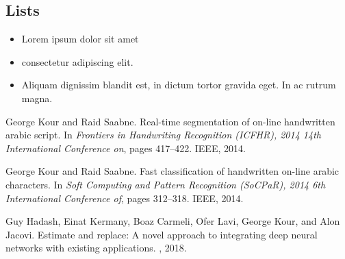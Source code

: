 \documentclass{article}
\begin{document}
\subsection{Lists}
\begin{itemize}
\item Lorem ipsum dolor sit amet
\item consectetur adipiscing elit. 
\item Aliquam dignissim blandit est, in dictum tortor gravida eget. In ac rutrum magna.
\end{itemize}


  


\begin{thebibliography}{1}

George Kour and Raid Saabne.
\newblock Real-time segmentation of on-line handwritten arabic script.
\newblock In {\em Frontiers in Handwriting Recognition (ICFHR), 2014 14th
  International Conference on}, pages 417--422. IEEE, 2014.

George Kour and Raid Saabne.
\newblock Fast classification of handwritten on-line arabic characters.
\newblock In {\em Soft Computing and Pattern Recognition (SoCPaR), 2014 6th
  International Conference of}, pages 312--318. IEEE, 2014.

Guy Hadash, Einat Kermany, Boaz Carmeli, Ofer Lavi, George Kour, and Alon
  Jacovi.
\newblock Estimate and replace: A novel approach to integrating deep neural
  networks with existing applications.
, 2018.

\end{thebibliography}
\end{document}
